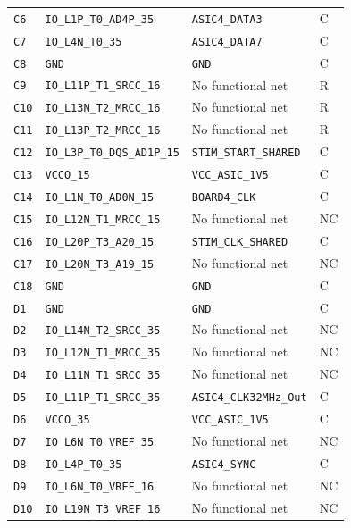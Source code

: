 \documentclass[10pt,a4paper]{article}
\begin{document}
\begin{longtable}{@{}P{15mm}P{42mm}P{92mm}P{10mm}@{}}
\nolinkurl{C6} & \nolinkurl{IO_L1P_T0_AD4P_35} & \nolinkurl{ASIC4_DATA3} & C \\
\nolinkurl{C7} & \nolinkurl{IO_L4N_T0_35} & \nolinkurl{ASIC4_DATA7} & C \\
\nolinkurl{C8} & \nolinkurl{GND} & \nolinkurl{GND} & C \\
\nolinkurl{C9} & \nolinkurl{IO_L11P_T1_SRCC_16} & No functional net & R \\
\nolinkurl{C10} & \nolinkurl{IO_L13N_T2_MRCC_16} & No functional net & R \\
\nolinkurl{C11} & \nolinkurl{IO_L13P_T2_MRCC_16} & No functional net & R \\
\nolinkurl{C12} & \nolinkurl{IO_L3P_T0_DQS_AD1P_15} & \nolinkurl{STIM_START_SHARED} & C \\
\nolinkurl{C13} & \nolinkurl{VCCO_15} & \nolinkurl{VCC_ASIC_1V5} & C \\
\nolinkurl{C14} & \nolinkurl{IO_L1N_T0_AD0N_15} & \nolinkurl{BOARD4_CLK} & C \\
\nolinkurl{C15} & \nolinkurl{IO_L12N_T1_MRCC_15} & No functional net & NC \\
\nolinkurl{C16} & \nolinkurl{IO_L20P_T3_A20_15} & \nolinkurl{STIM_CLK_SHARED} & C \\
\nolinkurl{C17} & \nolinkurl{IO_L20N_T3_A19_15} & No functional net & NC \\
\nolinkurl{C18} & \nolinkurl{GND} & \nolinkurl{GND} & C \\
\nolinkurl{D1} & \nolinkurl{GND} & \nolinkurl{GND} & C \\
\nolinkurl{D2} & \nolinkurl{IO_L14N_T2_SRCC_35} & No functional net & NC \\
\nolinkurl{D3} & \nolinkurl{IO_L12N_T1_MRCC_35} & No functional net & NC \\
\nolinkurl{D4} & \nolinkurl{IO_L11N_T1_SRCC_35} & No functional net & NC \\
\nolinkurl{D5} & \nolinkurl{IO_L11P_T1_SRCC_35} & \nolinkurl{ASIC4_CLK32MHz_Out} & C \\
\nolinkurl{D6} & \nolinkurl{VCCO_35} & \nolinkurl{VCC_ASIC_1V5} & C \\
\nolinkurl{D7} & \nolinkurl{IO_L6N_T0_VREF_35} & No functional net & NC \\
\nolinkurl{D8} & \nolinkurl{IO_L4P_T0_35} & \nolinkurl{ASIC4_SYNC} & C \\
\nolinkurl{D9} & \nolinkurl{IO_L6N_T0_VREF_16} & No functional net & NC \\
\nolinkurl{D10} & \nolinkurl{IO_L19N_T3_VREF_16} & No functional net & NC \\

\end{longtable}
\end{document}
